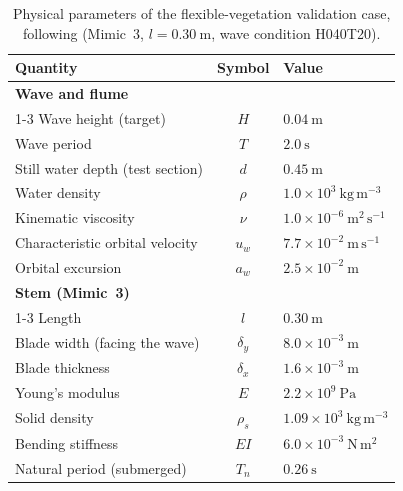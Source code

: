 \begin{table}[!ht]
\centering
\small
\caption{Physical parameters of the flexible-vegetation validation case, following \citet{jacobsen_waveinduced_2019} (Mimic~3, $l = 0.30~\mathrm{m}$, wave condition H040T20).}
\label{tab:flexveg_properties}
\setlength{\tabcolsep}{6pt}
\renewcommand{\arraystretch}{1.15}
\begin{tabular}{l c l}
\toprule
Quantity & Symbol & Value \\
\midrule
\multicolumn{3}{l}{\textbf{Wave and flume}} \\
\cmidrule(lr){1-3}
Wave height (target)             & $H$    & $0.04~\mathrm{m}$ \\
Wave period                      & $T$    & $2.0~\mathrm{s}$ \\
Still water depth (test section) & $d$    & $0.45~\mathrm{m}$ \\
Water density                    & $\rho$ & $1.0\times10^{3}~\mathrm{kg\,m^{-3}}$ \\
Kinematic viscosity              & $\nu$  & $1.0\times10^{-6}~\mathrm{m^{2}\,s^{-1}}$ \\
Characteristic orbital velocity  & $u_w$  & $7.7\times10^{-2}~\mathrm{m\,s^{-1}}$ \\
Orbital excursion                & $a_w$  & $2.5\times10^{-2}~\mathrm{m}$ \\
\midrule
\multicolumn{3}{l}{\textbf{Stem (Mimic~3)}} \\
\cmidrule(lr){1-3}
Length                           & $l$        & $0.30~\mathrm{m}$ \\
Blade width (facing the wave)    & $\delta_y$ & $8.0\times10^{-3}~\mathrm{m}$ \\
Blade thickness                  & $\delta_x$ & $1.6\times10^{-3}~\mathrm{m}$ \\
Young's modulus                  & $E$        & $2.2\times10^{9}~\mathrm{Pa}$ \\
Solid density                    & $\rho_s$   & $1.09\times10^{3}~\mathrm{kg\,m^{-3}}$ \\
Bending stiffness                & $EI$       & $6.0\times10^{-3}~\mathrm{N\,m^{2}}$ \\
Natural period (submerged)       & $T_n$      & $0.26~\mathrm{s}$ \\
\bottomrule
\end{tabular}
\end{table}

